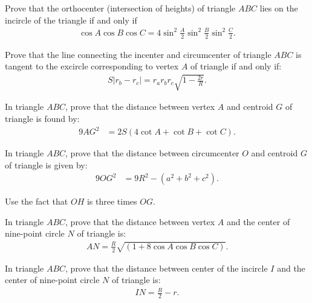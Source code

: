 \documentclass[12pt,a4paper]{memoir}
\theoremstyle{definition}
\begin{document}
\begin{question}
	Prove that the orthocenter (intersection of heights) of triangle $ABC$ lies on the incircle of the triangle if and only if
	\begin{align*}
		\cos A \cos B \cos C = 4\sin^2\frac{A}{2}\sin^2\frac{B}{2}\sin^2\frac{C}{2}.
	\end{align*}
\end{question}

\begin{question}
	Prove that the line connecting the incenter and circumcenter of triangle $ABC$ is tangent to the excircle corresponding to vertex $A$ of triangle if and only if:
	\begin{align*}
		S\left|r_b-r_c\right| = r_ar_br_c\sqrt{1-\frac{2r}{R}}.
	\end{align*}
\end{question}

\begin{question}[name=Distance Between Vertex and Centroid]
	In triangle $ABC$, prove that the distance between vertex $A$ and centroid $G$ of triangle is found by:
	\begin{align*}
		9AG^2 &= 2S(4\cot A + \cot B + \cot C).
	\end{align*}
\end{question}



\begin{question}[name=Distance Between Circumcenter and Centroid]
	In triangle $ABC$, prove that the distance between circumcenter $O$ and centroid $G$ of triangle is given by:
	\begin{align*}
		9OG^2 &= 9R^2 - (a^2+b^2+c^2).
	\end{align*}
\end{question}

\begin{solution}
	Use the fact that $OH$ is three times $OG$.
\end{solution}

\begin{question}[name=Distance Between Vertex and Nine-Point Center]
	In triangle $ABC$, prove that the distance between vertex $A$ and the center of nine-point circle $N$ of triangle is:
	\begin{align*}
		AN = \frac{R}{2}\sqrt{(1+8\cos A \cos B \cos C)}.
	\end{align*}
\end{question}

\begin{question}[name=Distance Between Incenter and Nine-Point Center]
	In triangle $ABC$, prove that the distance between center of the incircle $I$ and the center of nine-point circle $N$ of triangle is:
	\begin{align*}
		IN = \frac{R}{2}-r.
	\end{align*}
\end{question}
\end{document}
